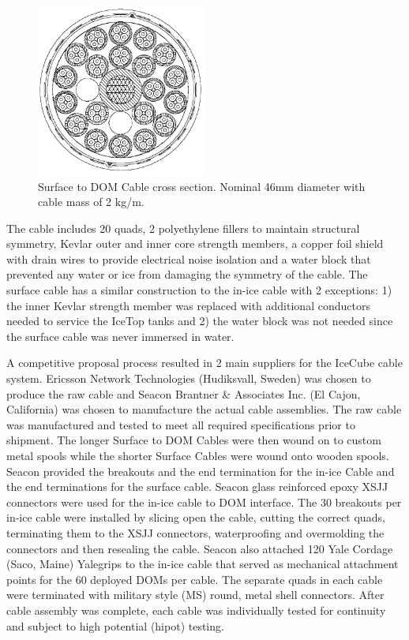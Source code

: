 \begin{figure}
  \centering
  \includegraphics[width=0.5\textwidth]{graphics/cables/cable_xsection.png}
  \caption{\label{fig:cable_xsection}Surface to DOM Cable cross
    section. Nominal 46mm diameter with cable mass of 2 kg/m.} 
\end{figure}

The cable includes 20 quads, 2 polyethylene fillers to maintain structural
symmetry, Kevlar outer and inner core strength members, a copper foil
shield with drain wires to provide electrical noise isolation and a water
block that prevented any water or ice from damaging the symmetry of the
cable. The surface cable has a similar construction to the in-ice
cable with 2 exceptions: 1) the inner Kevlar strength member was replaced with additional conductors needed to service the IceTop tanks and 2) the water block was not needed since the surface cable was never immersed in water. 

A competitive proposal process resulted in 2 main suppliers for the IceCube
cable system. Ericsson Network Technologies (Hudiksvall, Sweden) was chosen
to produce the raw cable and Seacon Brantner \& Associates Inc. (El Cajon,
California) was chosen to manufacture the actual cable assemblies. The raw
cable was manufactured and tested to meet all required specifications prior
to shipment. The longer Surface to DOM Cables were then
wound on to custom metal spools while the shorter Surface Cables were wound
onto wooden spools. Seacon provided the breakouts
and the end termination for the in-ice Cable and the end
terminations for the surface cable. Seacon glass reinforced epoxy XSJJ
connectors were used for the in-ice
cable to DOM interface. The 30 breakouts per in-ice cable were installed by
slicing open the cable, cutting the correct quads, terminating them to the
XSJJ connectors, waterproofing and overmolding the connectors and then
resealing the cable. Seacon also
attached 120 Yale Cordage (Saco, Maine) Yalegrips to the in-ice
cable that served as mechanical attachment points for the 60 deployed DOMs
per cable. The separate quads in each cable were terminated with military
style (MS) round, metal shell connectors. After cable assembly was complete,
each cable was individually tested for continuity and subject to high
potential (hipot)
testing. 

